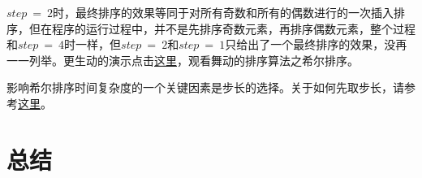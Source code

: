\documentclass[a4paper, 12pt, titlepage]{article}
\begin{document}
$step\ =\ 2$时，最终排序的效果等同于对所有奇数和所有的偶数进行的一次插入排序，但在程序的运行过程中，并不是先排序奇数元素，再排序偶数元素，整个过程和$step\ =\ 4$时一样，但$step\ =\ 2$和$step\ =\ 1$只给出了一个最终排序的效果，没再一一列举。更生动的演示点击\href{http://v.youku.com/v_show/id_XMjU4NTcwMDIw.html}{这里}，观看舞动的排序算法之希尔排序。

影响希尔排序时间复杂度的一个关键因素是步长的选择。关于如何先取步长，请参考\href{http://zh.wikipedia.org/wiki/\%E5\%B8\%8C\%E5\%B0\%94\%E6\%8E\%92\%E5\%BA\%8F#.E6.AD.A5.E9.95.BF.E5.BA.8F.E5.88.97}{这里}。

\section{总结}
\end{document}
